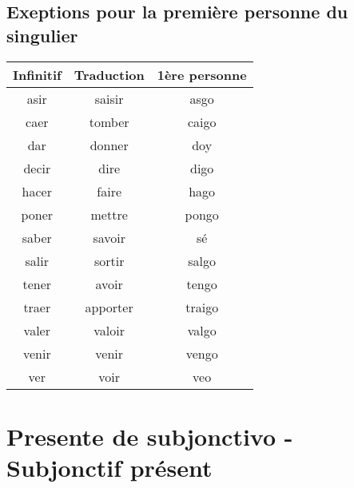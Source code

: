 \subsection{Exeptions pour la première personne du singulier}
\begin{table}[hbt!]
    \centering
    \setlength\tabcolsep{17.5pt}
    \begin{tabular}{|c|c|c|}
         \hline
         Infinitif        & Traduction     & 1ère personne \\
         \hline
         \hline
         asir              & saisir        & asgo           \\  
         \hline
         caer              & tomber        & caigo           \\
         \hline
         dar               & donner        & doy            \\
        \hline
         decir             & dire          & digo         \\
        \hline
         hacer             & faire         & hago          \\
        \hline
         poner             & mettre        & pongo           \\
        \hline
         saber             & savoir        & sé           \\
        \hline
         salir             & sortir        & salgo           \\
        \hline
         tener             & avoir         & tengo           \\
        \hline
         traer             & apporter      & traigo           \\
        \hline
         valer             & valoir        & valgo           \\
        \hline
         venir             & venir         & vengo           \\
        \hline
         ver               & voir          & veo           \\
        \hline
    \end{tabular}
    \label{tab:label2}
\end{table}
\newpage
\section{Presente de subjonctivo - Subjonctif présent}